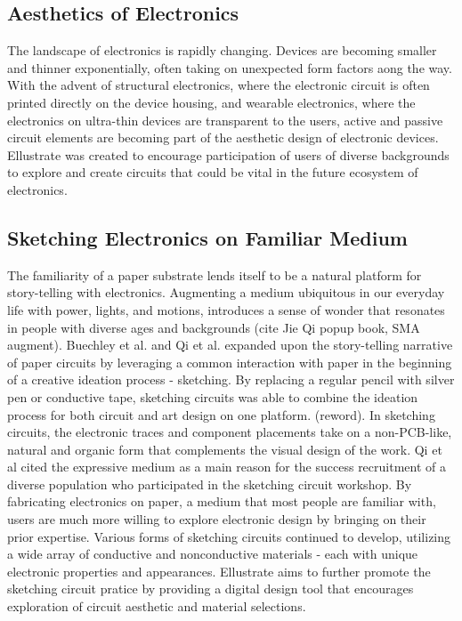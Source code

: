\documentclass{sigchi}
\begin{document}
\subsection{Aesthetics of Electronics}
The landscape of electronics is rapidly changing. Devices are becoming smaller and thinner exponentially, often taking on unexpected form factors aong the way. With the advent of structural electronics, where the electronic circuit is often printed directly on the device housing, and wearable electronics, where the electronics on ultra-thin devices are transparent to the users, active and passive circuit elements are becoming part of the aesthetic design of electronic devices. Ellustrate was created to encourage participation of users of diverse backgrounds to explore and create circuits that could be vital in the future ecosystem of electronics. 

\subsection{Sketching Electronics on Familiar Medium}
The familiarity of a paper substrate lends itself to be a natural platform for story-telling with electronics. Augmenting a medium ubiquitous in our everyday life with power, lights, and motions, introduces a sense of wonder that resonates in people with diverse ages and backgrounds \cite{karagozler_paper_2013}(cite Jie Qi popup book, SMA augment). Buechley et al. and Qi et al. expanded upon the story-telling narrative of paper circuits by leveraging a common interaction with paper in the beginning of a creative ideation process - sketching. By replacing a regular pencil with silver pen or conductive tape, sketching circuits was able to combine the ideation process for both circuit and art design on one platform. (reword). In sketching circuits, the electronic traces and component placements take on a non-PCB-like, natural and organic form that complements the visual design of the work. Qi et al cited the expressive medium as a main reason for the success recruitment of a diverse population who participated in the sketching circuit workshop. By fabricating electronics on paper, a medium that most people are familiar with, users are much more willing to explore electronic design by bringing on their prior expertise. Various forms of sketching circuits continued to develop, utilizing a wide array of conductive and nonconductive materials - each with unique electronic properties and appearances.  Ellustrate aims to further promote the sketching circuit pratice by providing a digital design tool that encourages exploration of circuit aesthetic and material selections.
\end{document}
